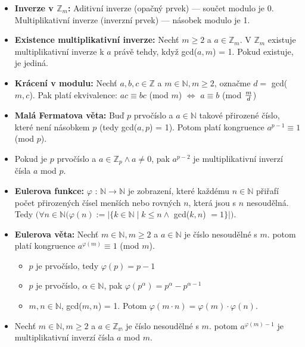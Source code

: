 \begin{itemize}
	\item \textbf{Inverze v $\mathbb{Z}_m$:} Aditivní inverze (opačný prvek) --- součet modulo je 0. Multiplikativní inverze (inverzní prvek) --- násobek modulo je 1.
	
	\item \textbf{Existence multiplikativní inverze:} Nechť $m \geq 2$ a $a \in \mathbb{Z}_m$. V $\mathbb{Z}_m$ existuje multiplikativní inverze k $a$ právě tehdy, když gcd($a, m$) = 1. Pokud existuje, je jediná. 
	
	\item \textbf{Krácení v modulu:} Nechť $a, b, c \in \mathbb{Z}$ a $m \in \mathbb{N}, m \geq 2$, označme $d =$ gcd($m, c$). Pak platí ekvivalence: $ac \equiv bc$ (mod $m$) $\Leftrightarrow$ $a \equiv b$ (mod $m \over d$)
	
	\item \textbf{Malá Fermatova věta:} Buď $p$ prvočíslo a $a \in \mathbb{N}$ takové přirozené číslo, které není násobkem $p$ (tedy gcd($a, p$) = 1). Potom platí kongruence $a^{p-1} \equiv 1$ (mod $p$).
	
	\item Pokud je $p$ prvočíslo a $a \in \mathbb{Z}_p \land a \neq 0$, pak $a^{p-2}$ je multiplikativní inverzí čísla $a$ mod $p$. 
	
	\item \textbf{Eulerova funkce:} $\varphi$ : $\mathbb{N} \rightarrow \mathbb{N}$ je zobrazení, které každému $n \in \mathbb{N}$ přiřafí počet přirozených čísel menších nebo rovných $n$, která jsou s $n$ nesoudělná. Tedy $(\forall n \in \mathbb{N}(\varphi (n) := |\{k \in \mathbb{N} \mid k \leq n \land$ gcd($k, n$) $ = 1\}|)$.
	
	\item \textbf{Eulerova věta:} Nechť $m \in \mathbb{N}, m \geq 2$ a $a \in \mathbb{N}$ je číslo nesoudělné s $m$. potom platí kongruence $a^{\varphi(m)} \equiv 1$ (mod $m$).
	
	\begin{itemize}
		\item $p$ je prvočíslo, tedy $\varphi(p) = p - 1$
		\item $p$ je prvočíslo, $\alpha \in \mathbb{N}$, pak $\varphi(p^\alpha) = p^\alpha - p^{\alpha - 1}$
		\item $m, n \in \mathbb{N}$, gcd($m, n$) = 1. Potom $\varphi(m\cdot n) = \varphi(m) \cdot \varphi (n)$.
	\end{itemize}
	
	\item Nechť $m \in \mathbb{N}, m \geq 2$ a $a \in \mathbb{Z_m}$ je číslo nesoudělné s $m$. potom $a^{\varphi(m) - 1}$ je multiplikativní inverzí čísla $a$ mod $m$.
	

\end{itemize}
